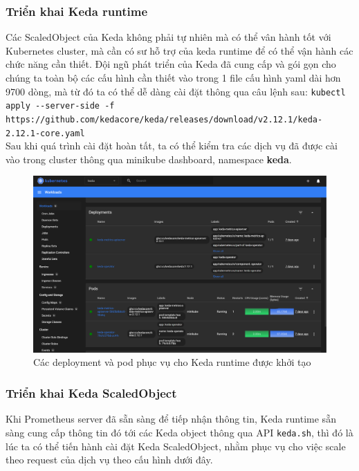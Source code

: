 \subsubsection{Triển khai Keda runtime}
\noindent Các ScaledObject của Keda không phải tự nhiên mà có thể vân hành tốt với Kubernetes cluster, mà cần có sư hỗ trợ của keda runtime để có thể vận hành các chức năng cần thiết. Đội ngũ phát triển của Keda đã cung cấp và gói gọn cho chúng ta toàn bộ các cấu hình cần thiết vào trong 1 file cấu hình yaml dài hơn 9700 dòng, mà từ đó ta có thể dễ dàng cài đặt thông qua câu lệnh sau: \lstinline|kubectl apply --server-side -f https://|\lstinline|github.com/kedacore/keda/releases/download/v2.12.1/keda-2.12.1-core.yaml|\\[0.2cm]
Sau khi quá trình cài đặt hoàn tất, ta có thể kiểm tra các dịch vụ đã được cài vào trong cluster thông qua minikube dashboard, namespace \textbf{keda}.
\begin{figure}[H]
  \begin{center}
    \includegraphics[scale=0.4]{images/hanh/keda-deployment.png}
    \caption{Các deployment và pod phục vụ cho Keda runtime được khởi tạo}
  \end{center}
  \label{}
\end{figure}

\subsubsection{Triển khai Keda ScaledObject}
\noindent Khi Prometheus server đã sẵn sàng để tiếp nhận thông tin, Keda runtime sẵn sàng cung cấp thông tin đó tới các Keda object thông qua API \lstinline|keda.sh|, thì đó là lúc ta có thể tiến hành cài đặt Keda ScaledObject, nhằm phục vụ cho việc scale theo request của dịch vụ theo cấu hình dưới đây.

